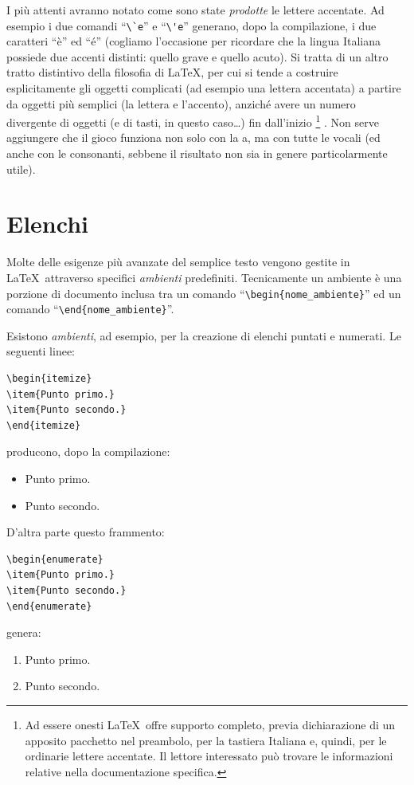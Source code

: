 I pi\`u attenti avranno notato come sono state \emph{prodotte} le lettere
accentate. Ad esempio i due comandi ``\verb|\`e|'' e ``\verb|\'e|'' generano,
dopo la compilazione, i due caratteri ``\`e'' ed ``\'e'' (cogliamo l'occasione
per ricordare che la lingua Italiana possiede due accenti distinti: quello
grave e quello acuto).
Si tratta di un altro tratto distintivo della filosofia di \LaTeX, per cui si
tende a costruire esplicitamente gli oggetti complicati (ad esempio una
lettera accentata) a partire da oggetti pi\`u semplici (la lettera e
l'accento), anzich\'e avere un numero divergente di oggetti (e di tasti,
in questo caso\ldots) fin dall'inizio%
\footnote{
Ad essere onesti \LaTeX\ offre supporto completo, previa dichiarazione di un
apposito pacchetto nel preambolo, per la tastiera Italiana e, quindi, per le
ordinarie lettere accentate. Il lettore interessato pu\`o trovare le
informazioni relative nella documentazione specifica.
}%
.
Non serve aggiungere che il gioco funziona non solo con la a, ma con tutte le
vocali (ed anche con le consonanti, sebbene il risultato non sia in genere
particolarmente utile).


\section{Elenchi}

Molte delle esigenze pi\`u avanzate del semplice testo vengono gestite
in \LaTeX\ attraverso specifici \emph{ambienti} predefiniti.
Tecnicamente un ambiente \`e una porzione di documento inclusa tra un comando
``\verb|\begin{nome_ambiente}|'' ed un comando ``\verb|\end{nome_ambiente}|''.

Esistono \emph{ambienti}, ad esempio, per la creazione di elenchi puntati e
numerati. Le seguenti linee:
\begin{verbatim}
\begin{itemize}
\item{Punto primo.}
\item{Punto secondo.}
\end{itemize}
\end{verbatim}
producono, dopo la compilazione:
\begin{itemize}
\item{Punto primo.}
\item{Punto secondo.}
\end{itemize}
D'altra parte questo frammento:
\begin{verbatim}
\begin{enumerate}
\item{Punto primo.}
\item{Punto secondo.}
\end{enumerate}
\end{verbatim}
genera:
\begin{enumerate}
\item{Punto primo.}
\item{Punto secondo.}
\end{enumerate}


